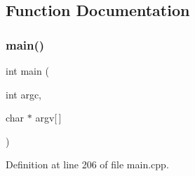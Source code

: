 \subsection{Function Documentation}
\mbox{\label{tests_2test-verbRec_2main_8cpp_a0ddf1224851353fc92bfbff6f499fa97}} 
\subsubsection{\texorpdfstring{main()}{main()}}
{\footnotesize\ttfamily int main (\begin{DoxyParamCaption}\item[{int}]{argc,  }\item[{char $\ast$}]{argv\mbox{[}$\,$\mbox{]} }\end{DoxyParamCaption})}



Definition at line 206 of file main.\+cpp.

